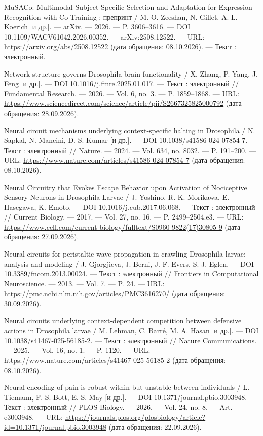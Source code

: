 \begin{list}{}{\setlength{\leftmargin}{10mm}\setlength{\labelwidth}{8mm}\setlength{\labelsep}{2mm}\setlength{\itemsep}{0pt}\setlength{\parsep}{0pt}\setlength{\topsep}{0pt}}
\item[192.] MuSACo: Multimodal Subject-Specific Selection and Adaptation for Expression Recognition with Co-Training : препринт / M. O. Zeeshan, N. Gillet, A. L. Koerich [и др.]. — arXiv. — 2026. — P. 3606–3616. — DOI 10.1109/WACV61042.2026.00352. — arXiv:2508.12522. — URL: \url{https://arxiv.org/abs/2508.12522} (дата обращения: 08.10.2026). — Текст : электронный.
\item[193.] Network structure governs Drosophila brain functionality / X. Zhang, P. Yang, J. Feng [и др.]. — DOI 10.1016/j.fmre.2025.01.017. — Текст : электронный // Fundamental Research. — 2026. — Vol. 6, no. 3. — P. 1859–1868. — URL: \url{https://www.sciencedirect.com/science/article/pii/S2667325825000792} (дата обращения: 28.09.2026).
\item[194.] Neural circuit mechanisms underlying context-specific halting in Drosophila / N. Sapkal, N. Mancini, D. S. Kumar [и др.]. — DOI 10.1038/s41586-024-07854-7. — Текст : электронный // Nature. — 2024. — Vol. 634, no. 8032. — P. 191–200. — URL: \url{https://www.nature.com/articles/s41586-024-07854-7} (дата обращения: 08.10.2026).
\item[195.] Neural Circuitry that Evokes Escape Behavior upon Activation of Nociceptive Sensory Neurons in Drosophila Larvae / J. Yoshino, R. K. Morikawa, E. Hasegawa, K. Emoto. — DOI 10.1016/j.cub.2017.06.068. — Текст : электронный // Current Biology. — 2017. — Vol. 27, no. 16. — P. 2499–2504.e3. — URL: \url{https://www.cell.com/current-biology/fulltext/S0960-9822(17)30805-9} (дата обращения: 27.09.2026).
\item[196.] Neural circuits for peristaltic wave propagation in crawling Drosophila larvae: analysis and modeling / J. Gjorgjieva, J. Berni, J. F. Evers, S. J. Eglen. — DOI 10.3389/fncom.2013.00024. — Текст : электронный // Frontiers in Computational Neuroscience. — 2013. — Vol. 7. — P. 24. — URL: \url{https://pmc.ncbi.nlm.nih.gov/articles/PMC3616270/} (дата обращения: 30.09.2026).
\item[197.] Neural circuits underlying context-dependent competition between defensive actions in Drosophila larvae / M. Lehman, C. Barré, M. A. Hasan [и др.]. — DOI 10.1038/s41467-025-56185-2. — Текст : электронный // Nature Communications. — 2025. — Vol. 16, no. 1. — P. 1120. — URL: \url{https://www.nature.com/articles/s41467-025-56185-2} (дата обращения: 08.10.2026).
\item[198.] Neural encoding of pain is robust within but unstable between individuals / L. Tiemann, F. S. Bott, E. S. May [и др.]. — DOI 10.1371/journal.pbio.3003948. — Текст : электронный // PLOS Biology. — 2026. — Vol. 24, no. 8. — Art. e3003948. — URL: \url{https://journals.plos.org/plosbiology/article?id=10.1371/journal.pbio.3003948} (дата обращения: 22.09.2026).

\end{list}
